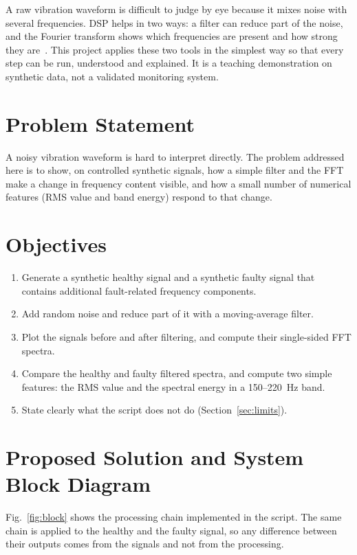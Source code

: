 \documentclass[10pt,twocolumn,a4paper]{article}
\begin{document}
A raw vibration waveform is difficult to judge by eye because it mixes noise with several frequencies. DSP helps in
two ways: a filter can reduce part of the noise, and the Fourier transform shows which frequencies are present and
how strong they are~\cite{oppenheim,proakis}. This project applies these two tools in the simplest way so that every
step can be run, understood and explained. It is a teaching demonstration on synthetic data, not a validated
monitoring system.

\section{Problem Statement}
A noisy vibration waveform is hard to interpret directly. The problem addressed here is to show, on controlled synthetic
signals, how a simple filter and the FFT make a change in frequency content visible, and how a small number of
numerical features (RMS value and band energy) respond to that change.

\section{Objectives}
\begin{enumerate}
\item Generate a synthetic healthy signal and a synthetic faulty signal that contains additional fault-related frequency components.
\item Add random noise and reduce part of it with a moving-average filter.
\item Plot the signals before and after filtering, and compute their single-sided FFT spectra.
\item Compare the healthy and faulty filtered spectra, and compute two simple features: the RMS value and the spectral energy in a 150--220~Hz band.
\item State clearly what the script does not do (Section~\ref{sec:limits}).
\end{enumerate}

\section{Proposed Solution and System Block Diagram}
Fig.~\ref{fig:block} shows the processing chain implemented in the script. The same chain is applied to the healthy and
the faulty signal, so any difference between their outputs comes from the signals and not from the processing.
\end{document}

